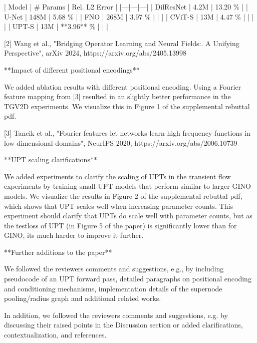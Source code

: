 | Model | # Params | Rel. L2 Error  |
|---|---|---|
| DilResNet | 4.2M | 13.20 \%  |
| U-Net | 148M | 5.68 \%  |
| FNO | 268M | 3.97 \%  |
| %
| %
| CViT-S | 13M | 4.47 \%  |
| %
| %
| %
| UPT-S | 13M | **3.96** \%  |
| %
| %

[2] Wang et al., "Bridging Operator Learning and Neural Fields:. A Unifying Perspective", arXiv 2024, https://arxiv.org/abs/2405.13998

**Impact of different positional encodings**

We added ablation results with different positional encoding.
Using a Fourier feature mapping from [3] resulted in an slightly better performance in the TGV2D experiments. We visualize this in Figure 1 of the supplemental rebuttal pdf.

[3] Tancik et al., "Fourier features let networks learn high frequency functions in low dimensional domains", NeurIPS 2020, https://arxiv.org/abs/2006.10739


**UPT scaling clarifications**

We added experiments to clarify the scaling of UPTs in the transient flow experiments by training small UPT models that perform similar to larger GINO models. We visualize the results in Figure 2 of the supplemental rebuttal pdf, which shows that UPT scales well when increasing parameter counts. This experiment should clarify that UPTs do scale well with parameter counts, but as the testloss of UPT (in Figure 5 of the paper) is significantly lower than for GINO, its much harder to improve it further.


**Further additions to the paper**

We followed the reviewers comments and suggestions, e.g., by including pseudocode of an UPT forward pass, detailed paragraphs on positional encoding and conditioning mechanisms, implementation details of the supernode pooling/radius graph and additional related works.


In addition, we followed the reviewers comments and suggestions, e.g. by discussing their raised points in the Discussion section or added clarifications, contextualization, and references.